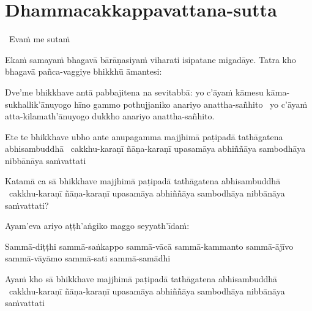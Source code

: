 \section{Dhammacakkappavattana-sutta}
\label{dhammacakkappavattana-full}

\begin{leader}
  \anglebracketleft\ \hspace{-0.5mm}Evaṁ me sutaṁ \hspace{-0.5mm}\anglebracketright\
\end{leader}

\begin{pali-hang}
  Ekaṁ samayaṁ bhagavā bārāṇasiyaṁ viharati isipatane migadāye.  Tatra kho bhagavā pañca-vaggiye bhikkhū āmantesi:
\end{pali-hang}

\begin{pali-hang}
  Dve'me bhikkhave antā pabbajitena na sevitabbā: yo c'āyaṁ kāmesu kāma-sukhallik'ānuyogo hīno gammo pothujjaniko anariyo anattha-sañhito \breathmark\ yo c'āyaṁ atta-kilamath'ānuyogo dukkho anariyo anattha-sañhito.
\end{pali-hang}

\begin{pali-hang}
  Ete te bhikkhave ubho ante anupagamma majjhimā paṭipadā tathāgatena abhisambuddhā \breathmark\ cakkhu-karaṇī ñāṇa-karaṇī upasamāya abhiññāya sambodhāya nibbānāya saṁvattati
\end{pali-hang}

\begin{pali-hang}
  Katamā ca sā bhikkhave majjhimā paṭipadā tathāgatena abhisambuddhā \breathmark\ cakkhu-karaṇī ñāṇa-karaṇī upasamāya abhiññāya sambodhāya nibbānāya saṁvattati?
\end{pali-hang}

\begin{pali-hang}
  Ayam'eva ariyo aṭṭh'aṅgiko maggo seyyath'īdaṁ:
\end{pali-hang}

\begin{pali-hang}
  Sammā-diṭṭhi sammā-saṅkappo sammā-vācā sammā-kammanto sammā-ājīvo sammā-vāyāmo sammā-sati sammā-samādhi
\end{pali-hang}

\begin{pali-hang}
  Ayaṁ kho sā bhikkhave majjhimā paṭipadā tathāgatena abhisambuddhā \breathmark\ cakkhu-karaṇī ñāṇa-karaṇī upasamāya abhiññāya sambodhāya nibbānāya saṁvattati
\end{pali-hang}

